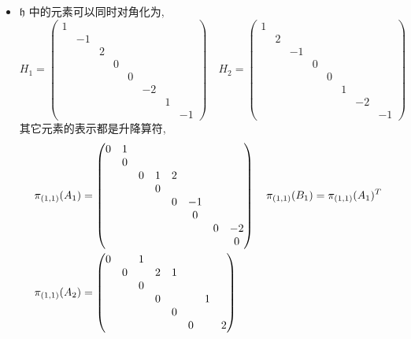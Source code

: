 \begin{itemize}
	\item $\mathfrak{h}$ 中的元素可以同时对角化为,
	\begin{equation}
		H_1 = \begin{pmatrix}
			1 & & & & & & & \\
			& - 1 & & & & & & \\
			& & 2 & & & & & \\
			& & & 0 & & & & \\
			& & & & 0 & & & \\
			& & & & & - 2 & & \\
			& & & & & & 1 & \\
			& & & & & & & - 1
		\end{pmatrix} \quad H_2 = \begin{pmatrix}
			1 & & & & & & & \\
			& 2 & & & & & & \\
			& & - 1 & & & & & \\
			& & & 0 & & & & \\
			& & & & 0 & & & \\
			& & & & & 1 & & \\
			& & & & & & - 2 & \\
			& & & & & & & - 1
		\end{pmatrix}
	\end{equation}
	其它元素的表示都是升降算符,
	\begin{align}
		& \pi_{(1, 1)}(A_1) = \begin{pmatrix}
			0 & 1 & & & & & & \\
			& 0 & & & & & & \\
			& & 0 & 1 & 2 & & & \\
			& & & 0 & & & & \\
			& & & & 0 & - 1 & & \\
			& & & & & 0 & & \\
			& & & & & & 0 & - 2 \\
			& & & & & & & 0
		\end{pmatrix} \quad \pi_{(1, 1)}(B_1) = \pi_{(1, 1)}(A_1)^T \notag \\
		& \pi_{(1, 1)}(A_2) = \begin{pmatrix}
			0 & & 1 & & & & & \\
			& 0 & & 2 & 1 & & & \\
			& & 0 & & & & & \\
			& & & 0 & & & 1 & \\
			& & & & 0 & & & \\
			& & & & & 0 & & 2 \\

\end{pmatrix}
\end{align}
\end{itemize}
